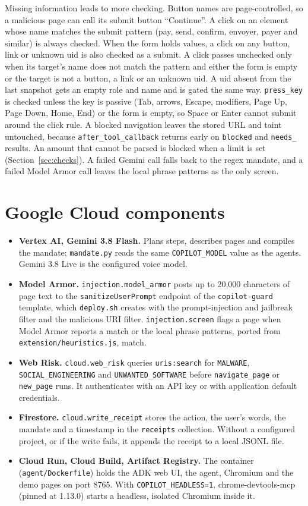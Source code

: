 \documentclass[11pt]{article}
\newcommand{\code}[1]{\texttt{#1}}
\begin{document}
Missing information leads to more checking. Button names are page-controlled, so a malicious page can call its submit button ``Continue''. A click on an element whose name matches the submit pattern (pay, send, confirm, envoyer, payer and similar) is always checked. When the form holds values, a click on any button, link or unknown uid is also checked as a submit. A click passes unchecked only when its target's name does not match the pattern and either the form is empty or the target is not a button, a link or an unknown uid. A uid absent from the last snapshot gets an empty role and name and is gated the same way. \code{press\_key} is checked unless the key is passive (Tab, arrows, Escape, modifiers, Page Up, Page Down, Home, End) or the form is empty, so Space or Enter cannot submit around the click rule. A blocked navigation leaves the stored URL and taint untouched, because \code{after\_tool\_callback} returns early on \code{blocked} and \code{needs\_} results. An amount that cannot be parsed is blocked when a limit is set (Section~\ref{sec:checks}). A failed Gemini call falls back to the regex mandate, and a failed Model Armor call leaves the local phrase patterns as the only screen.

\section{Google Cloud components}

\begin{itemize}
\item \textbf{Vertex AI, Gemini 3.8 Flash.} Plans steps, describes pages and compiles the mandate; \code{mandate.py} reads the same \code{COPILOT\_MODEL} value as the agents. Gemini 3.8 Live is the configured voice model.
\item \textbf{Model Armor.} \code{injection.model\_armor} posts up to 20{,}000 characters of page text to the \code{sanitizeUserPrompt} endpoint of the \code{copilot-guard} template, which \code{deploy.sh} creates with the prompt-injection and jailbreak filter and the malicious URI filter. \code{injection.screen} flags a page when Model Armor reports a match or the local phrase patterns, ported from \code{extension/heuristics.js}, match.
\item \textbf{Web Risk.} \code{cloud.web\_risk} queries \code{uris:search} for \code{MALWARE}, \code{SOCIAL\_ENGINEERING} and \code{UNWANTED\_SOFTWARE} before \code{navigate\_page} or \code{new\_page} runs. It authenticates with an API key or with application default credentials.
\item \textbf{Firestore.} \code{cloud.write\_receipt} stores the action, the user's words, the mandate and a timestamp in the \code{receipts} collection. Without a configured project, or if the write fails, it appends the receipt to a local JSONL file.
\item \textbf{Cloud Run, Cloud Build, Artifact Registry.} The container (\code{agent/Dockerfile}) holds the ADK web UI, the agent, Chromium and the demo pages on port 8765. With \code{COPILOT\_HEADLESS=1}, chrome-devtools-mcp (pinned at 1.13.0) starts a headless, isolated Chromium inside it.
\end{itemize}
\end{document}
